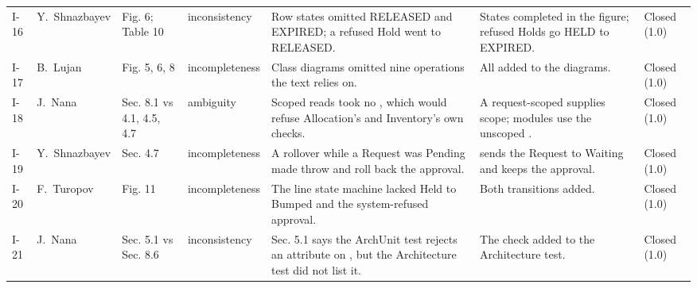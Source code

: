 {\begin{longtable}{@{}L{0.7cm}L{1.5cm}L{2.5cm}L{1.6cm}L{4.3cm}L{3.9cm}L{1.3cm}@{}}
I-16 & Y.\ Shnazbayev & Fig. 6; Table 10 & inconsistency & Row states omitted RELEASED and EXPIRED; a refused Hold went to RELEASED. & States completed in the figure; refused Holds go HELD to EXPIRED. & Closed (1.0) \\
I-17 & B.~Lujan & Fig. 5, 6, 8 & incompleteness & Class diagrams omitted nine operations the text relies on. & All added to the diagrams. & Closed (1.0) \\
I-18 & J.~Nana & Sec. 8.1 vs 4.1, 4.5, 4.7 & ambiguity & Scoped reads took no , which would refuse Allocation's and Inventory's own checks. & A request-scoped  supplies scope; modules use the unscoped . & Closed (1.0) \\
I-19 & Y.\ Shnazbayev & Sec. 4.7 & incompleteness & A rollover while a Request was Pending made  throw and roll back the approval. &  sends the Request to Waiting and keeps the approval. & Closed (1.0) \\
I-20 & F.~Turopov & Fig. 11 & incompleteness & The line state machine lacked Held to Bumped and the system-refused approval. & Both transitions added. & Closed (1.0) \\
I-21 & J.~Nana & Sec. 5.1 vs Sec. 8.6 & inconsistency & Sec. 5.1 says the ArchUnit test rejects an  attribute on , but the Architecture test did not list it. & The check added to the Architecture test. & Closed (1.0) \\
\end{longtable}
}
